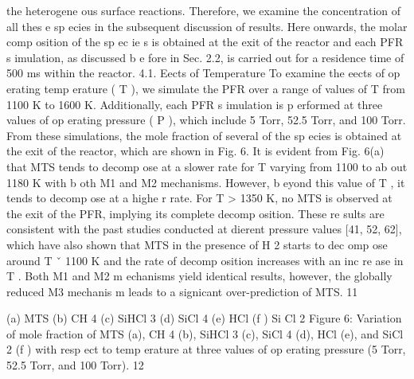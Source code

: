 \documentclass[10pt, letterpaper]{article}
\begin{document}
the heterogene ous surface reactions. Therefore, we examine the concentration of all thes e sp ecies in the
subsequent discussion of results. Here onwards, the molar comp osition of the sp ec ie s is obtained at the exit
of the reactor and each PFR s imulation, as discussed b e fore in Sec. 2.2, is carried out for a residence time
of 500 ms within the reactor.
4.1. Eects of Temperature
To examine the eects of op erating temp erature (
T
), we simulate the PFR over a range of values of
T
from 1100 K to 1600 K. Additionally, each PFR s imulation is p erformed at three values of op erating pressure
(
P
), which include 5 Torr, 52.5 Torr, and 100 Torr. From these simulations, the mole fraction of several of
the sp ecies is obtained at the exit of the reactor, which are shown in Fig. 6.
It is evident from Fig. 6(a) that MTS tends to decomp ose at a slower rate for
T
varying from 1100 to
ab out 1180 K with b oth M1 and M2 mechanisms. However, b eyond this value of
T
, it tends to decomp ose
at a highe r rate. For
T >
1350 K, no MTS is observed at the exit of the PFR, implying its complete
decomp osition. These re sults are consistent with the past studies conducted at dierent pressure values
[41, 52, 62], which have also shown that MTS in the presence of H
2
starts to dec omp ose around
T
ˇ
1100
K and the rate of decomp osition increases with an inc re ase in
T
. Both M1 and M2 m echanisms yield
identical results, however, the globally reduced M3 mechanis m leads to a signicant over-prediction of MTS.
11


(a) MTS
(b) CH
4
(c) SiHCl
3
(d) SiCl
4
(e) HCl
(f ) Si Cl
2
Figure 6: Variation of mole fraction of MTS (a), CH
4
(b), SiHCl
3
(c), SiCl
4
(d), HCl (e), and SiCl
2
(f ) with resp ect to
temp erature at three values of op erating pressure (5 Torr, 52.5 Torr, and 100 Torr).
12
\end{document}
